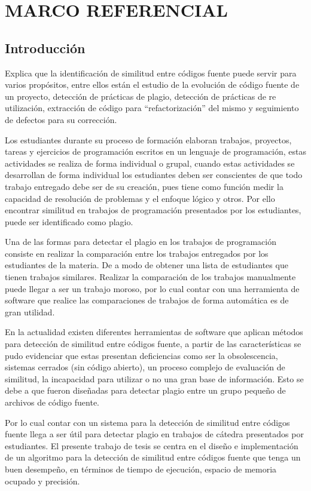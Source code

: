 \chapter{MARCO REFERENCIAL}

\section{Introducción}
\cite{unknown1} Explica que la identificación de similitud entre códigos fuente puede servir para varios propósitos, entre ellos están el estudio de la evolución de código fuente de un proyecto, detección de prácticas de plagio, detección de prácticas de re utilización, extracción de código para “refactorización” del mismo y seguimiento de defectos para su corrección.

Los estudiantes durante su proceso de formación elaboran trabajos, proyectos, tareas y ejercicios de programación escritos en un lenguaje de programación, estas actividades se realiza de forma individual o grupal, cuando estas actividades se desarrollan de forma individual los estudiantes deben ser conscientes de que todo trabajo entregado debe ser de su creación, pues tiene como función medir la capacidad de resolución de problemas y el enfoque lógico y otros. Por ello encontrar similitud en trabajos de programación presentados por los estudiantes, puede ser identificado como plagio.

Una de las formas para detectar el plagio en los trabajos de programación consiste en realizar la comparación entre los trabajos entregados por los estudiantes de la materia. De a modo de obtener una lista de estudiantes que tienen trabajos similares. Realizar la comparación de los trabajos manualmente puede llegar a ser un trabajo moroso, por lo cual contar con una herramienta de software que realice las comparaciones de trabajos de forma automática es de gran utilidad.

En la actualidad existen diferentes herramientas de software que aplican métodos para detección de similitud entre códigos fuente, a partir de las características se pudo evidenciar que estas presentan deficiencias como ser la obsolescencia, sistemas cerrados (sin código abierto), un proceso complejo de evaluación de similitud, la incapacidad para utilizar o no una gran base de información. Esto se debe a que fueron diseñadas para detectar plagio entre un grupo pequeño de archivos de código fuente.

Por lo cual contar con un sistema para la detección de similitud entre códigos fuente llega a ser útil para detectar plagio en trabajos de cátedra presentados por estudiantes. El presente trabajo de tesis se centra en el diseño e implementación de un algoritmo para la detección de similitud entre códigos fuente que tenga un buen desempeño, en términos de tiempo de ejecución, espacio de memoria ocupado y precisión.
